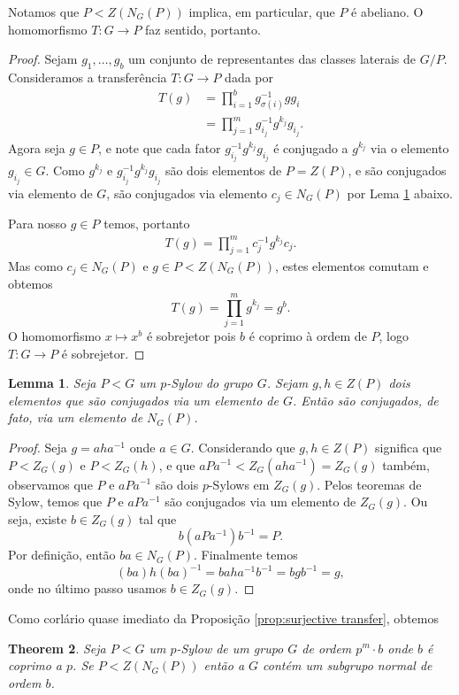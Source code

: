 \documentclass[12pt]{article}
\theoremstyle{plain}
\newtheorem{thm}{Theorem}[section]
\newtheorem{lemma}[thm]{Lemma}
\theoremstyle{definition}
\begin{document}
Notamos que $P < Z(N_G(P))$ implica, em particular, que $P$ é abeliano. O homomorfismo $T : G \rightarrow P$ faz sentido, portanto.

\begin{proof}
Sejam $g_1, \ldots, g_b$ um conjunto de representantes das classes laterais de $G / P$. Consideramos a transferência $T : G \rightarrow P$ dada por
\begin{align*}
T(g) &= \prod_{i=1}^b g_{\sigma(i)}^{-1} g g_i \\
%
&= \prod_{j=1}^m g_{i_j}^{-1} g^{k_j} g_{i_j}.
\end{align*}
Agora seja $g \in P$, e note que cada fator $g_{i_j}^{-1} g^{k_j} g_{i_j}$ é conjugado a $g^{k_j}$ via o elemento $g_{i_j} \in G$. Como $g^{k_j}$ e $g_{i_j}^{-1} g^{k_j} g_{i_j}$ são dois elementos de $P = Z(P)$, e são conjugados via elemento de $G$, são conjugados via elemento $c_j \in N_G(P)$ por Lema \ref{lem:special.conj} abaixo.

Para nosso $g \in P$ temos, portanto
\begin{align*}
T(g) = \prod_{j=1}^m c_{j}^{-1} g^{k_j} c_{j}.
\end{align*}
Mas como $c_j \in N_G(P)$ e $g \in P < Z(N_G(P))$, estes elementos comutam e obtemos
\[
T(g) = \prod_{j=1}^m g^{k_j} = g^b.
\]
O homomorfismo $x \mapsto x^b$ é sobrejetor pois $b$ é coprimo à ordem de $P$, logo $T : G \rightarrow P$ é sobrejetor.
\end{proof}


\begin{lemma}\label{lem:special.conj}
Seja $P < G$ um $p$-Sylow do grupo $G$. Sejam $g, h \in Z(P)$ dois elementos que são conjugados via um elemento de $G$. Então são conjugados, de fato, via um elemento de $N_G(P)$.
\end{lemma}

\begin{proof}
Seja $g = aha^{-1}$ onde $a \in G$. Considerando que $g, h \in Z(P)$ significa que $P < Z_G(g)$ e $P < Z_G(h)$, e que $aPa^{-1} < Z_G(aha^{-1}) = Z_G(g)$ também, observamos que $P$ e $aPa^{-1}$ são dois $p$-Sylows em $Z_G(g)$. Pelos teoremas de Sylow, temos que $P$ e $aPa^{-1}$ são conjugados via um elemento de $Z_G(g)$. Ou seja, existe $b \in Z_G(g)$ tal que
\[
b(aPa^{-1})b^{-1} = P.
\]
Por definição, então $ba \in N_G(P)$. Finalmente temos
\[
(ba) h (ba)^{-1} = b a h a^{-1} b^{-1} = b g b^{-1} = g,
\]
onde no último passo usamos $b \in Z_G(g)$.
\end{proof}


Como corlário quase imediato da Proposição \ref{prop:surjective transfer}, obtemos
\begin{thm}\label{thm:normal.complement}
Seja $P < G$ um $p$-Sylow de um grupo $G$ de ordem $p^m \cdot b$ onde $b$ é coprimo a $p$. Se $P < Z(N_G(P))$ então a $G$ contém um subgrupo normal de ordem $b$.
\end{thm}
\end{document}
